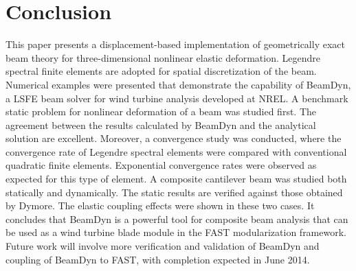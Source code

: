 \section{Conclusion}

This paper presents a displacement-based implementation of geometrically
exact beam theory for three-dimensional nonlinear elastic deformation. Legendre spectral finite elements are adopted for spatial discretization of
the beam. Numerical examples were presented that demonstrate the capability
of BeamDyn, a LSFE beam solver for wind turbine analysis developed at NREL. A benchmark static problem for nonlinear deformation of a beam was studied first. The agreement between the results calculated by BeamDyn and the analytical solution are excellent. Moreover, a convergence study was conducted, where the convergence rate of Legendre spectral elements were compared with conventional quadratic finite elements. Exponential convergence rates were observed as expected for this type of element. A composite cantilever beam was studied both statically and dynamically. The static results are verified against those obtained by Dymore. The elastic coupling effects were shown in these two cases. It concludes that BeamDyn is a powerful tool for composite beam analysis that can be used as a wind turbine blade module in the FAST modularization framework. Future work will involve more verification and validation of BeamDyn and coupling of BeamDyn to FAST, with completion expected in June 2014. 


